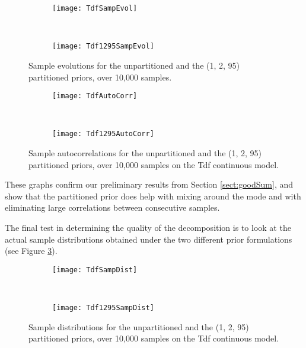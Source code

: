 \begin{figure}[h]
    \centering
    \begin{subfigure}[t]{0.48\textwidth}
      \texttt{[image: TdfSampEvol]}
    \end{subfigure}
    ~
    \begin{subfigure}[t]{0.48\textwidth}
      \texttt{[image: Tdf1295SampEvol]}
    \end{subfigure}
    \caption{Sample evolutions for the unpartitioned and the (1, 2, 95) partitioned priors, over 10,000 samples.}
    \label{fig:tdfPSampEvol}
\end{figure}

\begin{figure}[h]
    \centering
    \begin{subfigure}[t]{0.48\textwidth}
      \texttt{[image: TdfAutoCorr]}
    \end{subfigure}
    ~
    \begin{subfigure}[t]{0.48\textwidth}
      \texttt{[image: Tdf1295AutoCorr]}
    \end{subfigure}
    \caption{Sample autocorrelations for the unpartitioned and the (1, 2, 95) partitioned priors, over 10,000 samples on the Tdf continuous model.}
    \label{fig:tdfPAutoCorr}
\end{figure}

These graphs confirm our preliminary results from Section \ref{sect:goodSum}, and show that the partitioned prior does help with mixing around the mode and with eliminating large correlations between consecutive samples.

The final test in determining the quality of the decomposition is to look at the actual sample distributions obtained under the two different prior formulations (see Figure \ref{fig:tdfPDist}).

\begin{figure}[h]
    \centering
    \begin{subfigure}[t]{0.48\textwidth}
      \texttt{[image: TdfSampDist]}
    \end{subfigure}
    ~
    \begin{subfigure}[t]{0.48\textwidth}
      \texttt{[image: Tdf1295SampDist]}
    \end{subfigure}
    \caption{Sample distributions for the unpartitioned and the (1, 2, 95) partitioned priors, over 10,000 samples on the Tdf continuous model.}
    \label{fig:tdfPDist}
\end{figure}

